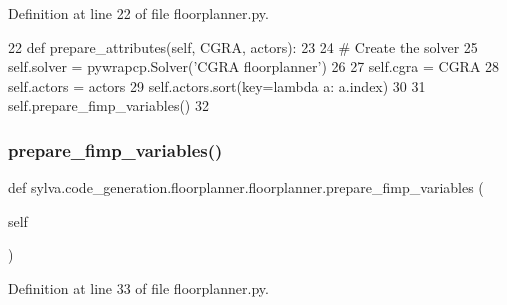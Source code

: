 Definition at line 22 of file floorplanner.\+py.


\begin{DoxyCode}
22   \textcolor{keyword}{def }prepare\_attributes(self, CGRA, actors):
23 
24     \textcolor{comment}{# Create the solver}
25     self.solver = pywrapcp.Solver(\textcolor{stringliteral}{'CGRA floorplanner'})
26 
27     self.cgra = CGRA
28     self.actors = actors
29     self.actors.sort(key=\textcolor{keyword}{lambda} a: a.index)
30 
31     self.prepare\_fimp\_variables()
32 
\end{DoxyCode}
\mbox{\label{classsylva_1_1code__generation_1_1floorplanner_1_1floorplanner_a387bfe2b35c791b09f18bf891f94d101}} 
\subsubsection{\texorpdfstring{prepare\+\_\+fimp\+\_\+variables()}{prepare\_fimp\_variables()}}
{\footnotesize\ttfamily def sylva.\+code\+\_\+generation.\+floorplanner.\+floorplanner.\+prepare\+\_\+fimp\+\_\+variables (\begin{DoxyParamCaption}\item[{}]{self }\end{DoxyParamCaption})}



Definition at line 33 of file floorplanner.\+py.


